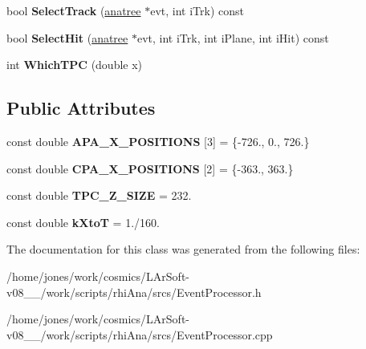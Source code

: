 \begin{DoxyCompactItemize}
\item 
\hypertarget{classcalib_1_1EventProcessor_ab7475e3c9e6a0fefece6f02deec92bd1}{bool {\bfseries Select\-Track} (\hyperlink{classanatree}{anatree} $\ast$evt, int i\-Trk) const }\label{classcalib_1_1EventProcessor_ab7475e3c9e6a0fefece6f02deec92bd1}

\item 
\hypertarget{classcalib_1_1EventProcessor_a84eefb48808eb6fe79337213e020984a}{bool {\bfseries Select\-Hit} (\hyperlink{classanatree}{anatree} $\ast$evt, int i\-Trk, int i\-Plane, int i\-Hit) const }\label{classcalib_1_1EventProcessor_a84eefb48808eb6fe79337213e020984a}

\item 
\hypertarget{classcalib_1_1EventProcessor_a41ad171510ce6ebce5c2781fb3b46961}{int {\bfseries Which\-T\-P\-C} (double x)}\label{classcalib_1_1EventProcessor_a41ad171510ce6ebce5c2781fb3b46961}

\end{DoxyCompactItemize}
\subsection*{Public Attributes}
\begin{DoxyCompactItemize}
\item 
\hypertarget{classcalib_1_1EventProcessor_a647db8f90d566862aa03b46ffde8c631}{const double {\bfseries A\-P\-A\-\_\-\-X\-\_\-\-P\-O\-S\-I\-T\-I\-O\-N\-S} \mbox{[}3\mbox{]} = \{-\/726., 0., 726.\}}\label{classcalib_1_1EventProcessor_a647db8f90d566862aa03b46ffde8c631}

\item 
\hypertarget{classcalib_1_1EventProcessor_a544483b159bec0f16ee91ad5e2a067d7}{const double {\bfseries C\-P\-A\-\_\-\-X\-\_\-\-P\-O\-S\-I\-T\-I\-O\-N\-S} \mbox{[}2\mbox{]} = \{-\/363., 363.\}}\label{classcalib_1_1EventProcessor_a544483b159bec0f16ee91ad5e2a067d7}

\item 
\hypertarget{classcalib_1_1EventProcessor_a5d575b3b15c62a4c48b7e407847db92c}{const double {\bfseries T\-P\-C\-\_\-\-Z\-\_\-\-S\-I\-Z\-E} = 232.}\label{classcalib_1_1EventProcessor_a5d575b3b15c62a4c48b7e407847db92c}

\item 
\hypertarget{classcalib_1_1EventProcessor_a562211bed340e1e30cb8abe3d50b5000}{const double {\bfseries k\-Xto\-T} = 1./160.}\label{classcalib_1_1EventProcessor_a562211bed340e1e30cb8abe3d50b5000}

\end{DoxyCompactItemize}


The documentation for this class was generated from the following files\-:\begin{DoxyCompactItemize}
\item 
/home/jones/work/cosmics/\-L\-Ar\-Soft-\/v08\-\_\-\_/work/scripts/rhi\-Ana/srcs/Event\-Processor.\-h\item 
/home/jones/work/cosmics/\-L\-Ar\-Soft-\/v08\-\_\-\_/work/scripts/rhi\-Ana/srcs/Event\-Processor.\-cpp\end{DoxyCompactItemize}
